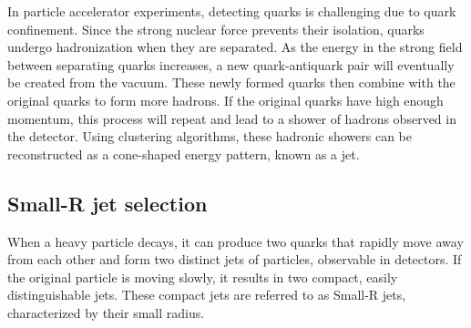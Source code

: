 In particle accelerator experiments, detecting quarks is challenging due to quark confinement.
Since the strong nuclear force prevents their isolation, quarks undergo hadronization when they are separated.
As the energy in the strong field between separating quarks increases, a new quark-antiquark pair will eventually be created from the vacuum.
These newly formed quarks then combine with the original quarks to form more hadrons.
If the original quarks have high enough momentum, this process will repeat and lead to a shower of hadrons observed in the detector. Using clustering algorithms, these hadronic showers can be reconstructed as a cone-shaped energy pattern, known as a jet.

\subsection{Small-R jet selection}
\label{subsec:jet_selection}

When a heavy particle decays, it can produce two quarks that rapidly move away from each other and form two distinct jets of particles, observable in detectors. If the original particle is moving slowly, it results in two compact, easily distinguishable jets.
These compact jets are referred to as Small-R jets, characterized by their small radius.

